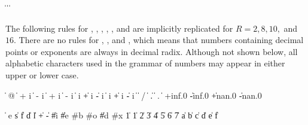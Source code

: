 \label{numbersyntax}

\begin{grammar}%
 \:  \| 
   \>  \|  \| 
\end{grammar}

The following rules for , , , , , and 
are implicitly replicated for \hbox{$R = 2, 8, 10,$}
and $16$.  There are no rules for , , and , which means that numbers containing
decimal points or exponents are always in decimal radix.
Although not shown below, all alphabetic characters used in the grammar
of numbers may appear in either upper or lower case.
\begin{grammar}%
 \:  
 \: %
      \|  @ 
   \> \|  +  i %
      \|  -  i
   \> \|  + i %
      \|  - i %
      \|   i 
   \> \| +  i %
      \| -  i
   \> \|  i %
      \| + i %
      \| - i
 \:  
   \> \| 
 \: %
   \> \|  / 
   \> \| 
 \: %
          
   \> \| .  
   \> \|  .  
 \: 
 \: %
          
   \> \|  
 \: +inf.0 \| -inf.0 \| +nan.0 \| -nan.0
\end{grammar}

\begin{grammar}%
 \:  
   \> \|   
 \: e \| s \| f \| d \| l
 \:   \| + \|  -
 \:  \| \#i \| \#e
 \: \#b
 \: \#o
 \:  \| \#d
 \: \#x
  \| 1
  \| 1 \| 2 \| 3 \| 4 \| 5 \| 6 \| 7
 \: 
 \:  \| a \| b \| c \| d \| e \| f %
\end{grammar}


